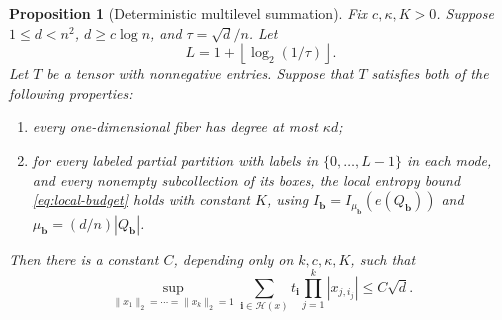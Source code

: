 \documentclass[10pt,a4paper]{amsart}
\numberwithin{equation}{section}
\newtheorem{proposition}[theorem]{Proposition}
\begin{document}
\begin{proposition}[Deterministic multilevel summation]\label{prop:heavy}
Fix $c,\kappa,K>0$. Suppose $1\le d<n^2$, $d\ge c\log n$, and
$\tau=\sqrt d/n$. Let
\begin{equation}\label{eq:L}
 L=1+\left\lfloor\log_2(1/\tau)\right\rfloor.
\end{equation}
Let $T$ be a tensor with nonnegative entries.
Suppose that $T$ satisfies both of the following properties:
\begin{enumerate}[label=(\roman*),leftmargin=*]
\item every one-dimensional fiber has degree at most $\kappa d$;
\item for every labeled partial partition with labels in $\{0,\ldots,L-1\}$
      in each mode, and every nonempty subcollection of its boxes, the local
      entropy bound \eqref{eq:local-budget} holds with constant $K$,
      using $I_{\mathbf{b}}=I_{\mu_{\mathbf{b}}}(e(Q_{\mathbf{b}}))$ and $\mu_{\mathbf{b}}=(d/n)|Q_{\mathbf{b}}|$.
\end{enumerate}
Then there is a constant $C$, depending only on $k,c,\kappa,K$, such that
\[
 \sup_{\|x_1\|_2=\cdots=\|x_k\|_2=1}
 \sum_{\mathbf i\in\mathcal H(x)}
       t_{\mathbf i}\prod_{j=1}^k|x_{j,i_j}|
 \le C\sqrt d.
\]
\end{proposition}
\end{document}
